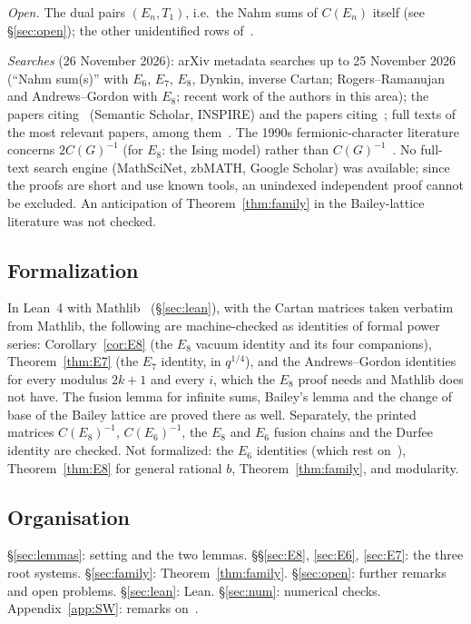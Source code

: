 \documentclass[11pt]{amsart}
\theoremstyle{definition}
\numberwithin{equation}{section}
\begin{document}
\emph{Open.} The dual pairs $(E_n,T_1)$, i.e.\ the Nahm sums of $C(E_n)$ itself (see
§\ref{sec:open}); the other unidentified rows of~\cite[Table~1]{SW}.

\emph{Searches} (26 November 2026): arXiv metadata searches up to 25 November 2026 (``Nahm sum(s)'' with
$E_6$, $E_7$, $E_8$, Dynkin, inverse Cartan; Rogers--Ramanujan and Andrews--Gordon with $E_8$; recent
work of the authors in this area); the papers citing~\cite{SW} (Semantic Scholar, INSPIRE) and
the papers citing~\cite{CF}; full texts of the most relevant papers, among
them~\cite{SW,CF,CRW,CW3,WW-Dr,WW-Dk,Yoshida,KKMM1,KKMM2,WP,VZ,Nahm,Melzer,BIS,Warnaar03}. The
1990s fermionic-character literature concerns $2C(G)^{-1}$ (for $E_8$: the Ising model) rather than
$C(G)^{-1}$~\cite{KKMM1,KKMM2,WP}. No full-text search engine (MathSciNet, zbMATH, Google Scholar) was
available; since the proofs are short and use known tools, an unindexed independent proof cannot be
excluded. An anticipation of Theorem~\ref{thm:family} in the Bailey-lattice literature was not checked.

\subsection{Formalization}
In Lean~4 with Mathlib~\cite{Lean4,Mathlib} (§\ref{sec:lean}), with the Cartan matrices taken verbatim
from Mathlib, the following are machine-checked as identities of formal power series: Corollary~\ref{cor:E8}
(the $E_8$ vacuum identity and its four companions), Theorem~\ref{thm:E7} (the $E_7$ identity, in
$q^{1/4}$), and the Andrews--Gordon identities for every modulus $2k+1$ and every $i$, which the $E_8$ proof
needs and Mathlib does not have. The fusion lemma for infinite sums, Bailey's lemma and the change of base
of the Bailey lattice are proved there as well. Separately, the printed matrices $C(E_8)^{-1}$, $C(E_6)^{-1}$,
the $E_8$ and $E_6$ fusion chains and the Durfee identity are checked. Not formalized: the $E_6$ identities
(which rest on~\cite{CRW}), Theorem~\ref{thm:E8} for general rational $b$, Theorem~\ref{thm:family}, and
modularity.

\subsection{Organisation}
§\ref{sec:lemmas}: setting and the two lemmas. §§\ref{sec:E8}, \ref{sec:E6}, \ref{sec:E7}: the three
root systems. §\ref{sec:family}: Theorem~\ref{thm:family}. §\ref{sec:open}: further remarks and open
problems. §\ref{sec:lean}: Lean. §\ref{sec:num}: numerical checks. Appendix~\ref{app:SW}: remarks on~\cite{SW}.
\end{document}
